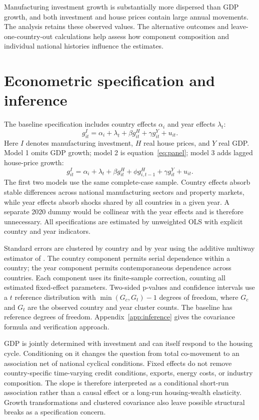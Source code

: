 \documentclass[11pt,letterpaper]{article}
\begin{document}
Manufacturing investment growth is substantially more dispersed than GDP growth, and both investment and house prices contain large annual movements. The analysis retains these observed values. The alternative outcomes and leave-one-country-out calculations help assess how component composition and individual national histories influence the estimates.

\section{Econometric specification and inference}
The baseline specification includes country effects $\alpha_i$ and year effects $\lambda_t$:
\begin{equation}\label{eq:panel}
g_{it}^{I}=\alpha_i+\lambda_t+\beta g_{it}^{H}+\gamma g_{it}^{Y}+u_{it}.
\end{equation}
Here $I$ denotes manufacturing investment, $H$ real house prices, and $Y$ real GDP. Model 1 omits GDP growth; model 2 is equation~\eqref{eq:panel}; model 3 adds lagged house-price growth:
\begin{equation}\label{eq:lag}
g_{it}^{I}=\alpha_i+\lambda_t+\beta g_{it}^{H}+\phi g_{i,t-1}^{H}+\gamma g_{it}^{Y}+u_{it}.
\end{equation}
The first two models use the same complete-case sample. Country effects absorb stable differences across national manufacturing sectors and property markets, while year effects absorb shocks shared by all countries in a given year. A separate 2020 dummy would be collinear with the year effects and is therefore unnecessary. All specifications are estimated by unweighted OLS with explicit country and year indicators.

Standard errors are clustered by country and by year using the additive multiway estimator of \citet{cameron2011}. The country component permits serial dependence within a country; the year component permits contemporaneous dependence across countries. Each component uses its finite-sample correction, counting all estimated fixed-effect parameters. Two-sided p-values and confidence intervals use a $t$ reference distribution with $\min(G_c,G_t)-1$ degrees of freedom, where $G_c$ and $G_t$ are the observed country and year cluster counts. The baseline has \PanelDof{} reference degrees of freedom. Appendix~\ref{app:inference} gives the covariance formula and verification approach.

GDP is jointly determined with investment and can itself respond to the housing cycle. Conditioning on it changes the question from total co-movement to an association net of national cyclical conditions. Fixed effects do not remove country-specific time-varying credit conditions, exports, energy costs, or industry composition. The slope is therefore interpreted as a conditional short-run association rather than a causal effect or a long-run housing-wealth elasticity. Growth transformations and clustered covariance also leave possible structural breaks as a specification concern.
\end{document}

